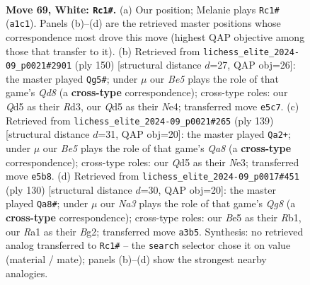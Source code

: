 \documentclass[11pt]{article}
\begin{document}
\clearpage

\begin{figure}[p]\centering
\begin{subfigure}{0.46\textwidth}\centering
\resizebox{\linewidth}{!}{%
\newchessgame
\chessboard[
  setfen={2k5/8/8/p2QB3/P7/N4p2/8/R5K1 w - - 0 69},
  showmover=false,
  pgfstyle=straightmove, color=movearrow, markmove={a1-c1}
]}
\caption{}
\end{subfigure}\hfill
\begin{subfigure}{0.46\textwidth}\centering
\resizebox{\linewidth}{!}{%
\newchessgame
\chessboard[
  setfen={3Q4/3B4/8/7k/3KN3/3R2p1/8/8 w - - 3 76},
  showmover=false,
  pgfstyle=straightmove, color=movearrow, markmove={d8-g5}
]}
\caption{}
\end{subfigure}
\\[4pt]
\begin{subfigure}{0.46\textwidth}\centering
\resizebox{\linewidth}{!}{%
\newchessgame
\chessboard[
  setfen={8/8/6k1/2p5/2P5/1K2n3/6r1/q7 b - - 3 70},
  showmover=false,
  pgfstyle=straightmove, color=movearrow, markmove={a1-a2}
]}
\caption{}
\end{subfigure}\hfill
\begin{subfigure}{0.46\textwidth}\centering
\resizebox{\linewidth}{!}{%
\newchessgame
\chessboard[
  setfen={6Q1/k7/8/4P3/p4P2/2NK4/6B1/1R6 w - - 0 66},
  showmover=false,
  pgfstyle=straightmove, color=movearrow, markmove={g8-a8}
]}
\caption{}
\end{subfigure}
\caption{\textbf{Move 69, White: \texttt{Rc1\#}.} (a) Our position; Melanie plays \texttt{Rc1\#} (\texttt{a1c1}). Panels (b)--(d) are the retrieved master positions whose correspondence most drove this move (highest QAP objective among those that transfer to it). (b) Retrieved from \texttt{lichess\_elite\_2024-09\_p0021\#2901} (ply 150) [structural distance $d$=27, QAP obj=26]: the master played \texttt{Qg5\#}; under $\mu$ our \emph{Be5} plays the role of that game's \emph{Qd8} (a \textbf{cross-type} correspondence); cross-type roles: our \emph{Q}d5 as their \emph{R}d3, our \emph{Q}d5 as their \emph{N}e4; transferred move \texttt{e5c7}. (c) Retrieved from \texttt{lichess\_elite\_2024-09\_p0021\#265} (ply 139) [structural distance $d$=31, QAP obj=20]: the master played \texttt{Qa2+}; under $\mu$ our \emph{Be5} plays the role of that game's \emph{Qa8} (a \textbf{cross-type} correspondence); cross-type roles: our \emph{Q}d5 as their \emph{N}e3; transferred move \texttt{e5b8}. (d) Retrieved from \texttt{lichess\_elite\_2024-09\_p0017\#451} (ply 130) [structural distance $d$=30, QAP obj=20]: the master played \texttt{Qa8\#}; under $\mu$ our \emph{Na3} plays the role of that game's \emph{Qg8} (a \textbf{cross-type} correspondence); cross-type roles: our \emph{B}e5 as their \emph{R}b1, our \emph{R}a1 as their \emph{B}g2; transferred move \texttt{a3b5}. Synthesis: no retrieved analog transferred to \texttt{Rc1\#} -- the \texttt{search} selector chose it on value (material / mate); panels (b)--(d) show the strongest nearby analogies.}
\label{fig:thought-m136}
\end{figure}
\end{document}
